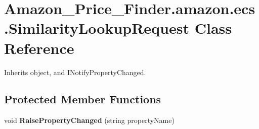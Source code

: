 \hypertarget{class_amazon___price___finder_1_1amazon_1_1ecs_1_1_similarity_lookup_request}{\section{Amazon\-\_\-\-Price\-\_\-\-Finder.\-amazon.\-ecs.\-Similarity\-Lookup\-Request Class Reference}
\label{class_amazon___price___finder_1_1amazon_1_1ecs_1_1_similarity_lookup_request}
}


 




Inherits object, and I\-Notify\-Property\-Changed.

\subsection*{Protected Member Functions}
\begin{DoxyCompactItemize}
\item 
\hypertarget{class_amazon___price___finder_1_1amazon_1_1ecs_1_1_similarity_lookup_request_a16f945b1a8afaf6964986ee38651cab1}{void {\bfseries Raise\-Property\-Changed} (string property\-Name)}\label{class_amazon___price___finder_1_1amazon_1_1ecs_1_1_similarity_lookup_request_a16f945b1a8afaf6964986ee38651cab1}

\end{DoxyCompactItemize}
